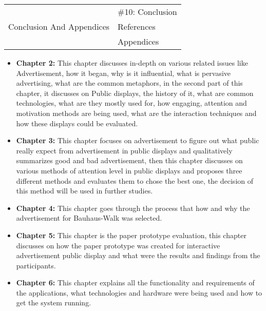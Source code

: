 \begin{table}[H]
\begin{tabular}{|c|l|}
\multirow{3}{*}{Conclusion And Appendices}    & \#10: Conclusion                                                                                            \\ \cline{2-2} 
                                              & References                                                                                                  \\ \cline{2-2} 
                                              & Appendices                                                                                                  \\ \hline
\end{tabular}
\end{table}



\begin{itemize}
\item \textbf{Chapter 2:}
 This chapter discusses in-depth on various related issues like Advertisement, how it began, why is it influential, what is pervasive advertising, what are the common metaphors, in the second part of this chapter, it discusses on Public displays, the history of it, what are common technologies, what are they mostly used for, how engaging, attention and motivation methods are being used, what are the interaction techniques and how these displays could be evaluated.


\item \textbf{Chapter 3:}
This chapter focuses on advertisement to figure out what public really expect from advertisement in public displays and qualitatively summarizes good and bad advertisement, then this chapter discusses on various methods of attention level in public displays and proposes three different methods and evaluates them to chose the best one, the decision of this method will be used in further studies.


\item \textbf{Chapter 4:}
This chapter goes through the process that how and why the advertisement for Bauhaus-Walk was selected.


\item \textbf{Chapter 5:}
This chapter is the paper prototype evaluation, this chapter discusses on how the paper prototype was created for interactive advertisement public display and what were the results and findings from the participants. 


\item \textbf{Chapter 6:}
This chapter explains all the functionality and requirements of the applications, what technologies and hardware were being used and how to get the system running.



\end{itemize}

